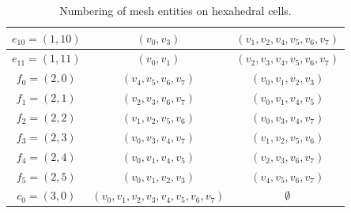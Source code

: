 \begin{table}[H]
\begin{center}
\begin{tabular}{|c|c|c|}
      \hline
      $e_{10} = (1, 10)$ & $(v_0, v_3)$ & $(v_1, v_2, v_4, v_5, v_6, v_7)$ \\
      \hline
      $e_{11} = (1, 11)$ & $(v_0, v_1)$ & $(v_2, v_3, v_4, v_5, v_6, v_7)$ \\
      \hline
      $f_0 = (2, 0)$ & $(v_4, v_5, v_6, v_7)$ & $(v_0, v_1, v_2, v_3)$ \\
      \hline
      $f_1 = (2, 1)$ & $(v_2, v_3, v_6, v_7)$ & $(v_0, v_1, v_4, v_5)$ \\
      \hline
      $f_2 = (2, 2)$ & $(v_1, v_2, v_5, v_6)$ & $(v_0, v_3, v_4, v_7)$ \\
      \hline
      $f_3 = (2, 3)$ & $(v_0, v_3, v_4, v_7)$ & $(v_1, v_2, v_5, v_6)$ \\
      \hline
      $f_4 = (2, 4)$ & $(v_0, v_1, v_4, v_5)$ & $(v_2, v_3, v_6, v_7)$ \\
      \hline
      $f_5 = (2, 5)$ & $(v_0, v_1, v_2, v_3)$ & $(v_4, v_5, v_6, v_7)$ \\
      \hline
      $c_0 = (3, 0)$ & $(v_0, v_1, v_2, v_3, v_4, v_5, v_6, v_7)$ & $\emptyset$ \\
      \hline
    \end{tabular}
    \caption{Numbering of mesh entities on hexahedral cells.}
    \label{tab:hexahedron,entities}
  \end{center}
\end{table}
